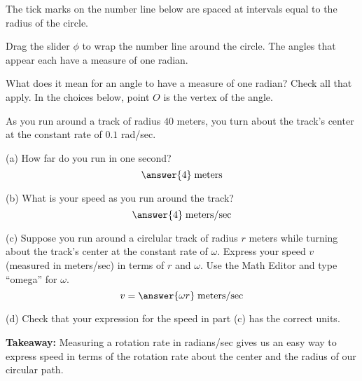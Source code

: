 \documentclass{ximera}
\begin{document}
\begin{exploration} \label{Esaghp:Cross}
The tick marks on the number line below are spaced at intervals equal to the radius of the circle.

Drag the slider $\phi$ to wrap the number line around the circle. The angles that appear each have a measure of one radian.

 
\begin{onlineOnly}
    \begin{center}
\end{center}
\end{onlineOnly}


\begin{question}   \label{Qsatd4th:Cross}
What does it mean for an angle to have a measure of one radian? Check all that apply. In the choices below, point $O$ is the vertex of the angle. 

\begin{selectAll}  
  \end{selectAll}  

\end{question}


\begin{question}  \label{Qt467743:Cross}
As you run around a track of radius $40$ meters, you turn about the track's center at the constant rate of $0.1$ rad/sec.

(a) How far do you run in one second?
\[
   \answer{4} \; \text{meters}
\]

(b) What is your speed as you run around the track?
\[
     \answer{4} \; \text{meters/sec} 
\]

(c) Suppose you run around a circlular track of radius $r$ meters while turning about the track's center at the constant rate of $\omega$. Express your speed $v$ (measured in meters/sec) in terms of $r$ and $\omega$. Use the Math Editor and type ``omega'' for $\omega$. 
\[
      v = \answer{\omega r} \; \text{meters/sec}
\]

(d) Check that your expression for the speed in part (c) has the correct units.


{\bf Takeaway:} Measuring a rotation rate in radians/sec gives us an easy way to express speed in terms of the rotation rate about the center and the radius of our circular path.

\end{question}
\end{exploration}
\end{document}
